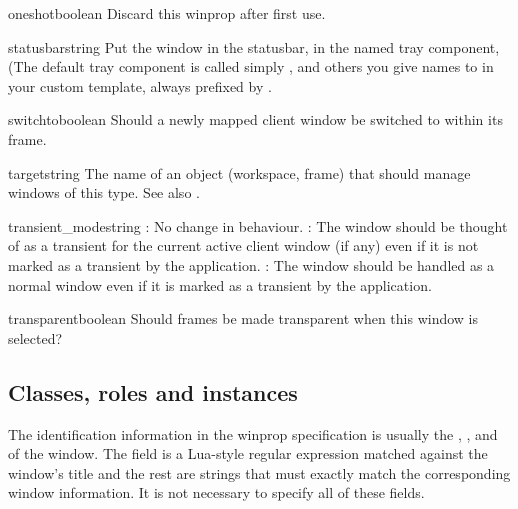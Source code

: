 \begin{winprop}{oneshot}{boolean}
    Discard this winprop after first use. 
\end{winprop}


\begin{winprop}{statusbar}{string}
    Put the window in the statusbar, in the named tray component,
    (The default tray component is called simply , 
    and others you give names to in your custom template, always 
    prefixed by .
\end{winprop}


\begin{winprop}{switchto}{boolean}
    Should a newly mapped client window be switched to within
    its frame.
\end{winprop}
        

\begin{winprop}{target}{string}
    The name of an object (workspace, frame) that should manage 
    windows of this type. See also .
\end{winprop}

        
\begin{winprop}{transient_mode}{string}
    : No change in behaviour. :
    The window should be thought of as a transient for the current
    active client window (if any) even if it is not marked as a
    transient by the application. : The window should 
    be handled as a normal window even if it is marked as a
    transient by the application. 
\end{winprop}


\begin{winprop}{transparent}{boolean}
    Should frames be made transparent when this window is selected? \\
\end{winprop}



\subsection{Classes, roles and instances}
\label{sec:classesrolesinstances}

The identification information in the winprop specification is usually the
,
,
 and
of the window. The  field is a Lua-style regular expression
matched against the window's title and the rest are strings that must
exactly match the corresponding window information. It is not necessary
to specify all of these fields.

